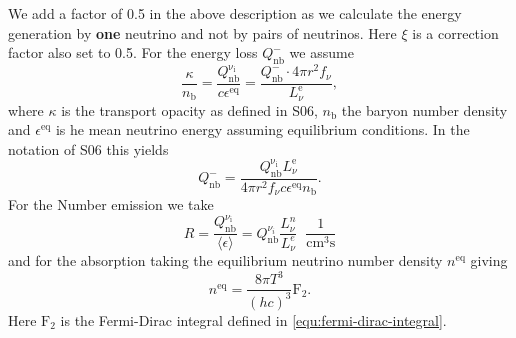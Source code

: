 \documentclass[fleqn,usenatbib]{mnras}
\begin{document}
\begin{appendices}
We add a factor of 0.5 in the above description as we calculate the energy generation by \textbf{one} neutrino and not by pairs of neutrinos. Here $\xi$ is a correction factor also set to 0.5.
For the energy loss $Q_{\mathrm{nb}}^{-}$ we assume
\begin{equation}
    \frac{\kappa}{n_{\mathrm{b}}} = \frac{Q_{\mathrm{nb}}^{\mathrm{\nu_i}}}{c \epsilon^{\mathrm{eq}}} = \frac{Q_{\mathrm{nb}}^{-}\cdot 4\pi r^2 f_{\nu}}{L_{\nu}^{\mathrm{e}}}, 
\end{equation}
where $\kappa$ is the transport opacity as defined in S06, $n_{\text{b}}$ the baryon number density and $\epsilon^{\mathrm{eq}}$ is he mean neutrino energy assuming equilibrium conditions.
In the notation of S06 this yields
\begin{equation}
    Q_{\mathrm{nb}}^{-} = \frac{Q_{\mathrm{nb}}^{\mathrm{\nu_i}} L_{\nu}^{\mathrm{e}} }{4\pi r^2 f_{\nu} c \epsilon^{\mathrm{eq}} n_{\mathrm{b}}}.
\end{equation}
For the Number emission we take
\begin{equation}
    R=\frac{Q_{\mathrm{nb}}^{\nu_{\mathrm{i}}}}{\langle \epsilon \rangle} = Q_{\mathrm{nb}}^{\nu_i} \frac{L_{\nu}^n }{L_{\nu}^e }\;\; \mathrm{\frac{1}{cm^3s}}
\end{equation}
and for the absorption taking the equilibrium neutrino number density $n^{\mathrm{eq}}$ giving
\begin{equation}
    n^{\mathrm{eq}} = \frac{8\pi T^3}{(hc)^3}\mathrm{F}_2.
\end{equation}
Here $\mathrm{F}_2$ is the Fermi-Dirac integral defined in \autoref{equ:fermi-dirac-integral}.

\end{appendices}
\newpage

\end{document}
